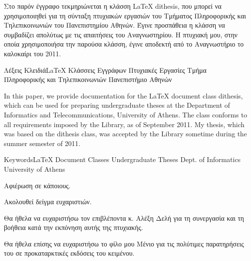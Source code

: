 \documentclass{dithesis}
\begin{document}
\maketitle

\begin{thesisabstract}[Περίληψη]
  Στο παρόν έγγραφο τεκμηριώνεται η κλάσση \LaTeX{} dithesis, που μπορεί να
  χρησιμοποιηθεί για τη σύνταξη πτυχιακών εργασιών του Τμήματος Πληροφορικής
  και Τηλεπικοινωνιών του Πανεπιστημίου Αθηνών.
  Έγινε προσπάθεια η κλάσση να συμβαδίζει απολύτως με τις απαιτήσεις του 
  Αναγνωστηρίου.
  H πτυχιακή μου, στην οποία χρησιμοποιήσα την παρούσα κλάσση, έγινε αποδεκτή 
  από το Αναγνωστήριο το καλοκαίρι του 2011. 
  
                 {Λέξεις Κλειδιά}{\LaTeX{}}
                                 {Κλάσσεις Εγγράφων}
                                 {Πτυχιακές Εργασίες}
                                 {Τμήμα Πληροφορικής και Τηλεπικοινωνιών}
                                 {Πανεπιστήμιο Αθηνών}
\end{thesisabstract}

\begin{thesisabstract}[Abstract]
  In this paper, we provide documentation for the \LaTeX{} document class
  dithesis, which can be used for preparing undergraduate theses at the 
  Department of Informatics and Telecommunications, University of Athens.
  The class conforms to all requirements imposed by the Library, as of September
  2011.
  My thesis, which was based on the dithesis class, was accepted by the Library
  sometime during the summer semester of 2011.

                 {Keywords}{\LaTeX{}}
                           {Document Classes}
                           {Undergraduate Theses}
                           {Dept. of Informatics}
                           {University of Athens}
\end{thesisabstract}

\begin{thesisdedication}
Αφιέρωση σε κάποιους.
\end{thesisdedication}

\begin{thesisacknowledgments}[Ευχαριστίες]
  Ακολουθεί δείγμα ευχαριστιών.

  Θα ήθελα να ευχαριστήσω τον επιβλέποντα κ. Αλέξη Δελή για τη συνεργασία και τη
  βοήθεια κατά την εκπόνηση αυτής της πτυχιακής.

  Θα ήθελα επίσης να ευχαριστήσω το φίλο μου Μένιο για τις πολύτιμες
  παρατηρήσεις του σε προκαταρκτικές εκδόσεις του κειμένου.
\end{thesisacknowledgments}
\end{document}
